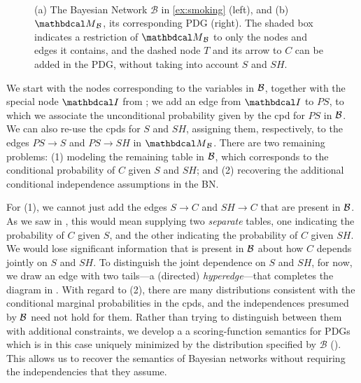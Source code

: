 \begin{example}[emulating a BN]
\begin{figure}[ht!]
\fi
	\hfill~
	\label{subfig:smoking-pdg}
\addtocounter{figure}{-1}
\caption[The classic ``smoking'' BN, its corresponding PDG, and a restriction of
    the latter, which can be augmented with other information about cancer.
]{ (a) The Bayesian Network $\mathcal B$ in \cref{ex:smoking} (left), and
(b) $\PDGof{\mathcal B}$, its corresponding PDG (right). The shaded box
indicates a restriction of $\PDGof{\mathcal B}$ to only the nodes and edges it
contains, and the dashed node $T$ and its arrow to $C$ can be added in the PDG,
without taking into account $S$ and $SH$.}
\label{fig:smoking-bn+pdg}
\end{figure}

We start with the nodes corresponding to the variables in $\cal B$, together
with the special node $\pdgunit$ from ; we add an edge
from ${\pdgunit}$ to $\mathit{PS}$, to which we associate the unconditional
probability given by the cpd for $\mathit{PS}$ in $\cal B$. We can also re-use
the cpds for $S$ and $\mathit{SH}$, assigning them, respectively, to the edges
$PS \to S$ and $PS \to SH$ in $\PDGof{{\mathcal B}}$.
There are two remaining problems: (1) modeling the remaining table in $\cal B$,
which corresponds to the conditional probability of $C$ given $S$ and $SH$; and
(2) recovering the additional
conditional
independence assumptions in the BN. 

For (1), we cannot just add the edges $S \to C$ and $SH \to C$ that are present
in $\cal B$. As we saw in , this would mean
supplying two \emph{separate} tables, one indicating the probability of $C$
given $S$, and the other indicating the probability of $C$ given
$\mathit{SH}$.  We would lose significant information that is
present in $\cal B$  about 
how $C$ depends jointly on $S$ and $SH$. To distinguish the joint dependence on
$S$ and $\mathit{SH}$, for now, we draw an edge with two tails---a
(directed)
\emph{hyperedge}---that completes the diagram in . 
With regard to (2), there are many distributions consistent with the conditional
marginal probabilities in the cpds, and the independences presumed by $\cal B$
need not hold for them. 
Rather than trying to distinguish between them with additional constraints,
we develop a a scoring-function semantics for PDGs
which 
is in this case uniquely minimized by the distribution 
specified by ${\mathcal B}$ ().
This allows us to recover the semantics of Bayesian networks without requiring the independencies that they assume.


\end{example}

